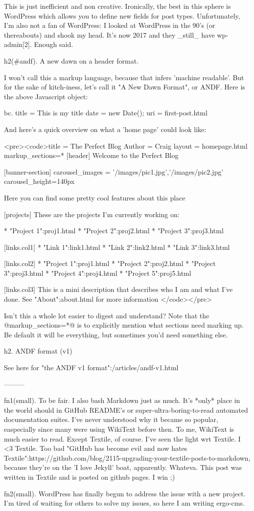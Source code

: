 This is just inefficient and non creative. Ironically, the best in this sphere is WordPress which allows you to define new fields for post types. Unfortunately, I'm also not a fan of WordPress: I looked at WordPress in the 90's (or thereabouts) and shook my head. It's now 2017 and they _still_ have wp-admin[2]. Enough said. 

h2(#andf). A new dawn on a header format.

I won't call this a markup language, because that infers 'machine readable'. But for the sake of kitch-iness, let's call it "A New Dawn Format", or ANDF. Here is the above Javascript object:

bc.
title = This is my title
date = {new Date();}
uri = first-post.html

And here's a quick overview on what a 'home page' could look like:


<pre><code>title = The Perfect Blog
Author = Craig
layout = homepage.html
markup_sections=*
[header]
Welcome to the Perfect Blog

[banner-section]
carousel_images = '/images/pic1.jpg','/images/pic2.jpg'
carousel_height=140px

Here you can find some pretty cool features about this place

[projects]
These are the projects I'm currently working on:

* "Project 1":proj1.html
* "Project 2":proj2.html
* "Project 3":proj3.html

[links.col1]
* "Link 1":link1.html
* "Link 2":link2.html
* "Link 3":link3.html


[links.col2]
* "Project 1":proj1.html
* "Project 2":proj2.html
* "Project 3":proj3.html
* "Project 4":proj4.html
* "Project 5":proj5.html


[links.col3]
This is a mini description that describes who I am and what I've done. See "About":about.html for more information
</code></pre>

Isn't this a whole lot easier to digest and understand? Note that the @markup_sections=*@ is to explicitly mention what sections need marking up. Be default it will be everything, but sometimes you'd need something else.

h2. ANDF format (v1)

See here for "the ANDF v1 format":/articles/andf-v1.html

---------


fn1(small). To be fair. I also bash Markdown just as much. It's *only* place in the world should in GitHub README's or super-ultra-boring-to-read automated documentation suites. I've never understood why it became so popular, easpecially since many were using WikiText before then. To me, WikiText is much easier to read. Except Textile, of course. I've seen the light wrt Textile. I <3 Textile. Too bad "GitHub has become evil and now hates Textile":https://github.com/blog/2115-upgrading-your-textile-posts-to-markdown, because they're on the 'I love Jekyll' boat, apparently. Whateva. This post was written in Textile and is posted on github pages. I win ;)

fn2(small). WordPress has finally begun to address the issue with a new project. I'm tired of waiting for others to solve my issues, so here I am writing ergo-cms.


